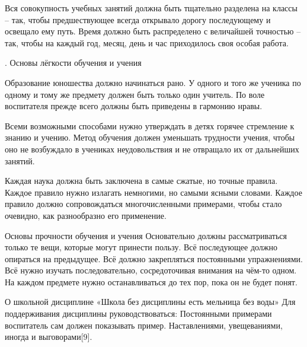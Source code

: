 \documentclass[12pt]{article}			%
\begin{document}
	{}
	Вся совокупность учебных занятий должна быть тщательно разделена на классы – так, чтобы предшествующее всегда открывало дорогу последующему и освещало ему путь.
	Время должно быть распределено с величайшей точностью – так, чтобы на каждый год, месяц, день и час приходилось своя особая работа.
	
	{. Основы лёгкости обучения и учения}
	
	{}
	Образование юношества должно начинаться рано.
	У одного и того же ученика по одному и тому же предмету должен быть только один учитель.
	По воле воспитателя прежде всего должны быть приведены в гармонию нравы.
	
	{}
	Всеми возможными способами нужно утверждать в детях горячее стремление к знанию и учению.
	Метод обучения должен уменьшать трудности учения, чтобы оно не возбуждало в учениках неудовольствия и не отвращало их от дальнейших занятий.
	
	{}
	Каждая наука должна быть заключена в самые сжатые, но точные правила.
	Каждое правило нужно излагать немногими, но самыми ясными словами.
	Каждое правило должно сопровождаться многочисленными примерами, чтобы стало очевидно, как разнообразно его применение.
	
	{ Основы прочности обучения и учения}
	Основательно должны рассматриваться только те вещи, которые могут принести пользу.
	Всё последующее должно опираться на предыдущее.
	Всё должно закрепляться постоянными упражнениями.
	Всё нужно изучать последовательно, сосредоточивая внимания на чём-то одном.
	На каждом предмете нужно останавливаться до тех пор, пока он не будет понят.
	
	{ О школьной дисциплине}
	«Школа без дисциплины есть мельница без воды»
	Для поддерживания дисциплины руководствоваться:
	Постоянными примерами воспитатель сам должен показывать пример.
	Наставлениями, увещеваниями, иногда и выговорами[9].
	
\end{document}
